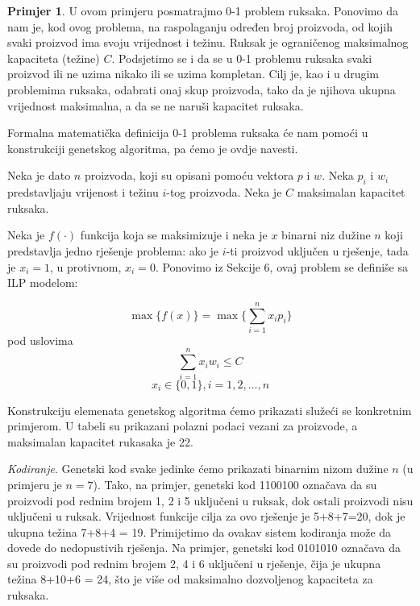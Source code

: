 \documentclass[a4paper, utf8, 11pt, colorlinks]{book}
\theoremstyle{definition}
\newtheorem{primjer}{Primjer}[chapter]
\begin{document}
\begin{primjer} U ovom primjeru posmatrajmo 0-1 problem ruksaka. Ponovimo da nam je, kod ovog problema, na raspolaganju određen broj proizvoda, od kojih svaki proizvod ima svoju vrijednost i težinu. Ruksak je ograničenog maksimalnog kapaciteta (težine) $C$. Podsjetimo se i da se u 0-1 problemu ruksaka svaki proizvod ili ne uzima nikako ili se uzima kompletan. Cilj je, kao i u drugim problemima ruksaka, odabrati onaj skup proizvoda, tako da je njihova ukupna vrijednost maksimalna, a da se ne naruši kapacitet ruksaka.
\end{primjer}
Formalna matematička definicija 0-1 problema ruksaka će nam pomoći u konstrukciji genetskog algoritma, pa ćemo je ovdje navesti.

Neka je dato $n$ proizvoda, koji su opisani pomoću vektora $p$ i $w$. Neka $p_i$ i $w_i$ predstavljaju vrijenost i težinu $i$-tog proizvoda. Neka je $C$ maksimalan kapacitet ruksaka.

Neka je $f(\cdot)$ funkcija koja se maksimizuje i neka je $x$ binarni niz dužine $n$ koji predstavlja jedno rješenje problema: ako je $i$-ti proizvod uključen u rješenje, tada je $x_i = 1$, u protivnom, $x_i =0$. Ponovimo iz Sekcije 6, ovaj problem se definiše sa ILP modelom:

$$\max \{f(x)\} = \max \{\sum_{i=1}^{n}x_ip_i\}$$
pod uslovima 
$$\sum_{i=1}^{n}x_iw_i\leqslant C$$
$$x_i\in\{0,1\}, i = 1,2,\ldots,n$$

Konstrukciju elemenata genetskog algoritma ćemo prikazati služeći se konkretnim primjerom. U tabeli su prikazani polazni podaci vezani za proizvode, a maksimalan kapacitet rukasaka je 22. 

\emph{Kodiranje}. Genetski kod svake jedinke ćemo prikazati binarnim nizom dužine $n$ (u primjeru je $n=7$). Tako, na primjer, genetski kod 1100100 označava da su proizvodi pod rednim brojem 1, 2 i 5 uključeni u ruksak, dok ostali proizvodi nisu uključeni u ruksak. Vrijednost funkcije cilja za ovo rješenje je 5+8+7=20, dok je ukupna težina 7+8+4 = 19. 
Primijetimo da ovakav sistem kodiranja može da dovede do nedopustivih rješenja. Na primjer, genetski kod 0101010 označava da su proizvodi pod rednim brojem 2, 4 i 6 uključeni u rješenje, čija je ukupna težina 8+10+6 = 24, što je više od maksimalno dozvoljenog kapaciteta za ruksaka.
\end{document}
